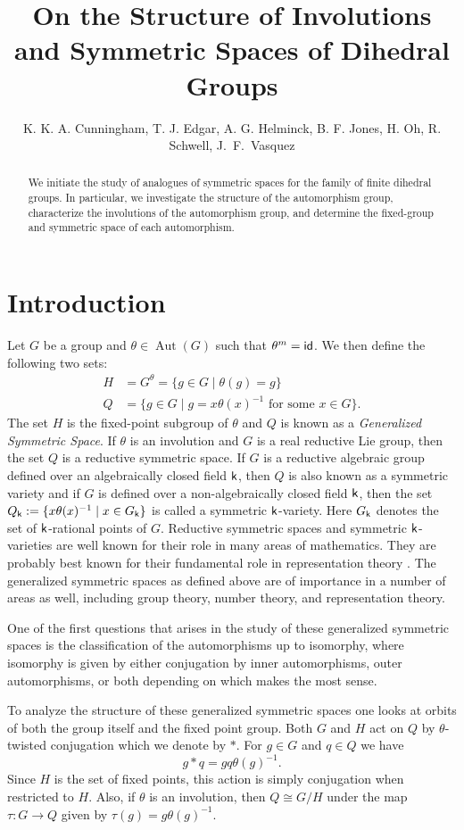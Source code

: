 \documentclass[12pt]{amsart}
\title{On the Structure of Involutions and Symmetric Spaces of Dihedral Groups}
\author{K. K. A. Cunningham, T. J. Edgar, A. G. Helminck, B. F. Jones, H. Oh, R. Schwell, J.~F.~Vasquez}
\numberwithin{equation}{section}
\theoremstyle{definition}
\newcommand{\Aut}{\operatorname{Aut}}
\begin{document}
\begin{abstract}
  We initiate the study of analogues of symmetric spaces for the
  family of finite dihedral groups. In particular, we investigate the
  structure of the automorphism group, characterize the involutions of
  the automorphism group, and determine the fixed-group and symmetric
  space of each automorphism.
\end{abstract}

\maketitle

\section*{Introduction}
Let $G$ be a group and $\theta\in\Aut(G)$ such that $\theta^m={\sf id}$. We then define the following two sets:
\begin{align*}
H &= G^\theta=\{g\in G\mid \theta(g)=g\}\\
Q &=\{g\in G\mid g=x\theta(x)^{-1} \mbox{ for some } x\in G\}.
\end{align*}
The set $H$ is the fixed-point subgroup of $\theta$ and $Q$ is known as a {\em Generalized Symmetric Space}. If $\theta$ is an involution and $G$ is a real reductive Lie group, then the set $Q$ is a reductive symmetric space. If $G$ is a reductive algebraic group defined over an algebraically closed field ${\sf k}$, then $Q$ is also known as a symmetric variety and if $G$ is defined over a non-algebraically closed field ${\sf k}$, then the set $Q_{\sf k}:= \{ x\theta(x)^{-1} \mid x\in G_{\sf k} \}$ is called a symmetric ${\sf k}$-variety. Here $G_{\sf k}$ denotes  the set of ${\sf k}$-rational points of $G$. Reductive symmetric spaces and symmetric ${\sf k}$-varieties are well known for their role in many areas of mathematics. They are probably best known for their fundamental role in representation theory  \cite{Helminck94}. The generalized symmetric spaces as defined above are of importance in a number of areas as well, including group theory, number theory, and representation theory. 

One of the first questions that arises in the study of these generalized symmetric spaces is the classification of the automorphisms up to isomorphy, where isomorphy is given by either conjugation by inner automorphisms, outer automorphisms, or both depending on which makes the most sense. 

To analyze the structure of these generalized symmetric spaces one looks at orbits of both the group itself and the fixed point group. 
Both $G$ and $H$ act on $Q$ by $\theta$-twisted conjugation which we denote by $*$. For $g\in G$ and $q\in Q$ we have
$$g*q=gq\theta(g)^{-1}.$$
Since $H$ is the set of fixed points, this action is simply conjugation when restricted to $H$. Also, if $\theta$ is an involution, then $Q\cong G/H$ under the map $\tau : G\to Q$ given by $\tau(g)=g\theta(g)^{-1}$. 
\end{document}
